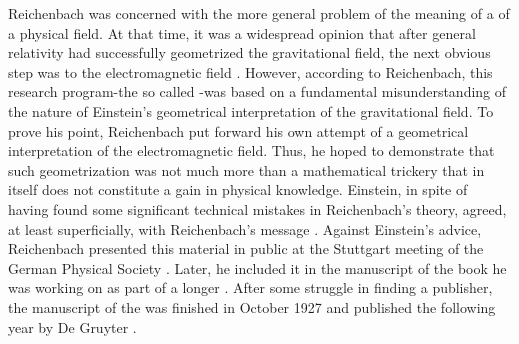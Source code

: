 \documentclass[submitted]{article}
\newcommand{\PRZL}{\citetitle{Reichenbach1928}\xspace}
\begin{document}
Reichenbach was concerned with the more general problem of the meaning of a  of a physical field. At that time, it was a widespread opinion that after general relativity had successfully geometrized the gravitational field, the next obvious step was to  the electromagnetic field . However, according to Reichenbach, this research program-the so called \uftp {}-was based on a fundamental misunderstanding of the nature of Einstein's geometrical interpretation of the gravitational field. To prove his point, Reichenbach put forward his own attempt of a geometrical interpretation of the electromagnetic field. Thus, he hoped to demonstrate that such geometrization was not much more than a mathematical trickery that in itself does not constitute a gain in physical knowledge. Einstein, in spite of having found some significant technical mistakes in Reichenbach's theory, agreed, at least superficially, with Reichenbach's  message \citep{Lehmkuhl2014}. Against Einstein's advice, Reichenbach presented this material in public at the Stuttgart meeting of the German Physical Society \citep{Reichenbach1926d}. Later, he included it in the manuscript of the book he was working on as part of a longer \Ap. After some struggle in finding a publisher, the manuscript of the \PRZL was finished in October 1927 and published the following year by De Gruyter \citep[044-06-25]{HR}.
\end{document}
